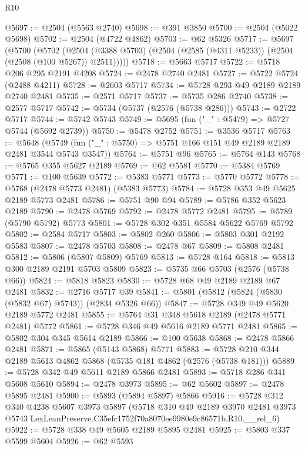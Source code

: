 \begin{lexlean}{R10}
\begin{coremodule}
@5697 := @2504 (@5563 @2740)
@5698 := @391 @3850
@5700 := @2504 (@5022 @5698)
@5702 := @2504 (@4722 @4862)
@5703 := @62 @5326
@5717 := @5697
    (@5700
      (@5702
        (@2504 (@3388 @5703) (@2504 (@2585 (@4311 @5233)) (@2504 (@2508 (@100 @5267)) @2511)))))
@5718 := @5663 @5717
@5722 := @5718 @206 @295 @2191 @4208
@5724 := @2478 @2740 @2481
@5727 := @5722 @5724 (@2488 @4211)
@5728 := @2603 @5717
@5734 := @5728 @293 @49 @2189 @2189 @2740 @2481
@5735 := @2571 @5717
@5737 := @5735 @286 @2740
@5738 := @2577 @5717
@5742 := @5734 (@5737 (@2576 (@5738 @286)))
@5743 := @2722 @5717
@5744 := @5742 @5743
@5749 := @5695 (fun ("_" : @5479) => @5727 @5744 (@5692 @2739))
@5750 := @5478 @2752
@5751 := @3536 @5717
@5763 := @5648
    (@5749 (fun ("_" : @5750) => @5751 @166 @151 @49 @2189 @2189 @2481 @3544 @5743 @3547))
@5764 := @5751 @96
@5765 := @5764 @143
@5768 := @5765 @355 @5627 @2189
@5769 := @62 @5581
@5770 := @5384 @5769
@5771 := @100 @5639
@5772 := @5383 @5771
@5773 := @5770 @5772
@5778 := @5768 (@2478 @5773 @2481) (@5383 @5773)
@5784 := @5728 @353 @49 @5625 @2189 @5773 @2481
@5786 := @5751 @90 @94
@5789 := @5786 @352 @5623 @2189
@5790 := @2478 @5769
@5792 := @2478 @5772 @2481
@5795 := @5789 (@5790 @5792) @5773
@5801 := @5728 @302 @351 @5584 @5622 @5769 @5792
@5802 := @2584 @5717
@5803 := @5802 @260
@5806 := @5803 @301 @2192 @5583
@5807 := @2478 @5703
@5808 := @2478 @67
@5809 := @5808 @2481
@5812 := @5806 (@5807 @5809) @5769
@5813 := @5728 @164
@5818 := @5813 @300 @2189 @2191 @5703 @5809
@5823 := @5735 @66 @5703 (@2576 (@5738 @66))
@5824 := @5818 @5823
@5830 := @5728 @68 @49 @2189 @2189 @67 @2481
@5832 := @2716 @5717 @39
@5841 := @5801 (@5812 (@5824 (@5830 (@5832 @67) @5743)) (@2834 @5326 @66))
@5847 := @5728 @349 @49 @5620 @2189 @5772 @2481
@5855 := @5764 @31 @348 @5618 @2189 (@2478 @5771 @2481) @5772
@5861 := @5728 @346 @49 @5616 @2189 @5771 @2481
@5865 := @5802 @304 @345 @5614 @2189
@5866 := @100 @5638
@5868 := @2478 @5866 @2481
@5871 := @5865 (@5143 @5868) @5771
@5883 := @5728 @210 @344 @2189 @5613 @4862 @5868 (@5735 @181 @4862 (@2576 (@5738 @181)))
@5889 := @5728 @342 @49 @5611 @2189 @5866 @2481
@5893 := @5718 @286 @341 @5608 @5610
@5894 := @2478 @3973
@5895 := @62 @5602
@5897 := @2478 @5895 @2481
@5900 := @5893 (@5894 @5897) @5866
@5916 := @5728
    @312
    @340
    @4238
    @5607
    @3973
    @5897
    (@5718
      @310
      @49
      @2189
      @3970
      @2481
      @3973
      @5743
      LexLeanPreserve.C35efc1752f70a8070ee9980e9c86571b.R10.__rel_6)
@5922 := @5728 @338 @49 @5605 @2189 @5895 @2481
@5925 := @5803 @337 @5599 @5604
@5926 := @62 @5593

\end{coremodule}
\end{lexlean}
